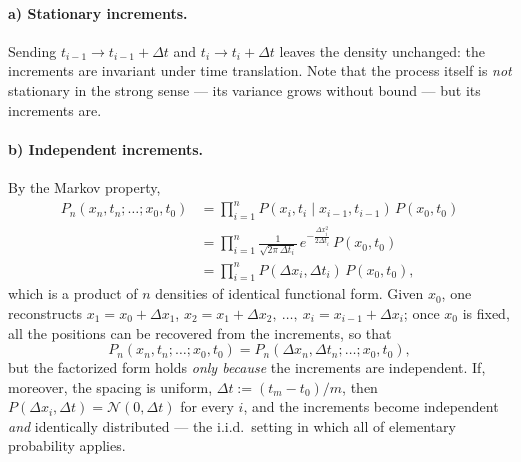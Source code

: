 \paragraph{a) Stationary increments.}
Sending $t_{i-1}\to t_{i-1}+\Delta t$ and $t_i\to t_i+\Delta t$ leaves the density unchanged: the increments are invariant under time translation.
Note that the process itself is \emph{not} stationary in the strong sense --- its variance grows without bound --- but its increments are.

\paragraph{b) Independent increments.}
By the Markov property,
\begin{equation}\begin{split}
P_n(x_n,t_n;\dots;x_0,t_0) &= \prod_{i=1}^{n} P(x_i,t_i\mid x_{i-1},t_{i-1})\,P(x_0,t_0)\\
&= \prod_{i=1}^{n} \frac{1}{\sqrt{2\pi\,\Delta t_i}}\,e^{-\frac{\Delta x_i^2}{2\Delta t_i}}\,P(x_0,t_0)\\
&= \prod_{i=1}^{n} P(\Delta x_i,\Delta t_i)\,P(x_0,t_0),
\end{split}\end{equation}
which is a product of $n$ densities of identical functional form.
Given $x_0$, one reconstructs $x_1 = x_0+\Delta x_1$, $x_2 = x_1+\Delta x_2,\ \dots,\ x_i = x_{i-1}+\Delta x_i$; once $x_0$ is fixed, all the positions can be recovered from the increments, so that
\begin{equation}
P_n(x_n,t_n;\dots;x_0,t_0) = P_n(\Delta x_n,\Delta t_n;\dots;x_0,t_0),
\end{equation}
but the factorized form holds \emph{only because} the increments are independent.
If, moreover, the spacing is uniform, $\Delta t := (t_m-t_0)/m$, then $P(\Delta x_i,\Delta t)=\mathcal{N}(0,\Delta t)$ for every $i$, and the increments become independent \emph{and} identically distributed --- the i.i.d.\ setting in which all of elementary probability applies.

